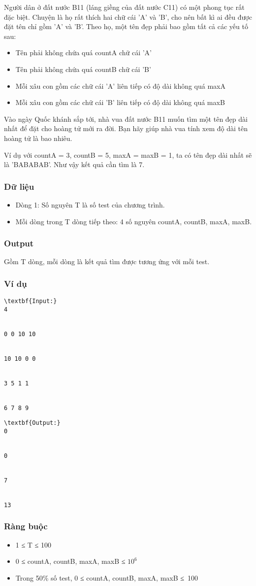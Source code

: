 



   Người dân ở đất nước B11 (láng giềng của đất nước C11) có một phong tục rất đặc biệt. Chuyện là họ rất thích hai chữ cái 'A' và 'B', cho nên bất kì ai đều được đặt tên chỉ gồm 'A' và 'B'. Theo họ, một tên đẹp phải bao gồm tất cả các yếu tố sau:  
\begin{itemize}
	\item     Tên phải không chứa quá countA chữ cái 'A'   
	\item     Tên phải không chứa quá countB chữ cái 'B'   
	\item     Mỗi xâu con gồm các chữ cái 'A' liên tiếp có độ dài không quá maxA   
	\item     Mỗi xâu con gồm các chữ cái 'B' liên tiếp có độ dài không quá maxB   
\end{itemize}

   Vào ngày Quốc khánh sắp tới, nhà vua đất nước B11 muốn tìm một tên đẹp dài nhất để đặt cho hoàng tử mới ra đời. Bạn hãy giúp nhà vua tính xem độ dài tên hoàng tử là bao nhiêu.  

   Ví dụ với countA = 3, countB = 5, maxA = maxB = 1, ta có tên đẹp dài nhất sẽ là 'BABABAB'. Như vậy kết quả cần tìm là 7.  

\subsubsection{   Dữ liệu  }
\begin{itemize}
	\item     Dòng 1: Số nguyên T là số test của chương trình.   
	\item     Mỗi dòng trong T dòng tiếp theo: 4 số nguyên countA, countB, maxA, maxB.   
\end{itemize}

\subsubsection{   Output  }

   Gồm T dòng, mỗi dòng là kết quả tìm được tương ứng với mỗi test.  

\subsubsection{   Ví dụ  }
\begin{verbatim}
\textbf{Input:}
4


0 0 10 10


10 10 0 0


3 5 1 1


6 7 8 9 \end{verbatim}
\begin{verbatim}
\textbf{Output:}
0


0


7


13 \end{verbatim}

\subsubsection{   Ràng buộc  }
\begin{itemize}
	\item     1 ≤ T ≤ 100   
	\item     0 ≤ countA, countB, maxA, maxB ≤ $10^{6}$
	\item     Trong 50\% số test, 0 ≤ countA, countB, maxA, maxB ≤ 100   
\end{itemize}
